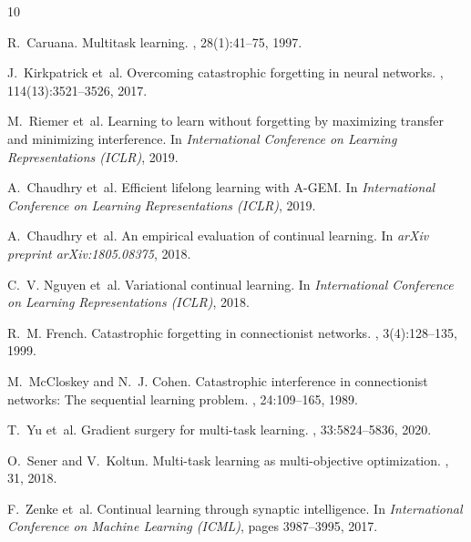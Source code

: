 \documentclass{article}
\begin{document}

\begin{thebibliography}{10}

R.~Caruana.
\newblock Multitask learning.
, 28(1):41--75, 1997.

J.~Kirkpatrick et~al.
\newblock Overcoming catastrophic forgetting in neural networks.
, 114(13):3521--3526, 2017.

M.~Riemer et~al.
\newblock Learning to learn without forgetting by maximizing transfer and minimizing interference.
\newblock In {\em International Conference on Learning Representations (ICLR)}, 2019.

A.~Chaudhry et~al.
\newblock Efficient lifelong learning with A-GEM.
\newblock In {\em International Conference on Learning Representations (ICLR)}, 2019.

A.~Chaudhry et~al.
\newblock An empirical evaluation of continual learning.
\newblock In {\em arXiv preprint arXiv:1805.08375}, 2018.

C.~V. Nguyen et~al.
\newblock Variational continual learning.
\newblock In {\em International Conference on Learning Representations (ICLR)}, 2018.

R.~M. French.
\newblock Catastrophic forgetting in connectionist networks.
, 3(4):128--135, 1999.

M.~McCloskey and N.~J. Cohen.
\newblock Catastrophic interference in connectionist networks: The sequential learning problem.
, 24:109--165, 1989.

T.~Yu et~al.
\newblock Gradient surgery for multi-task learning.
, 33:5824--5836, 2020.

O.~Sener and V.~Koltun.
\newblock Multi-task learning as multi-objective optimization.
, 31, 2018.

F.~Zenke et~al.
\newblock Continual learning through synaptic intelligence.
\newblock In {\em International Conference on Machine Learning (ICML)}, pages 3987--3995, 2017.


\end{thebibliography}
\end{document}
